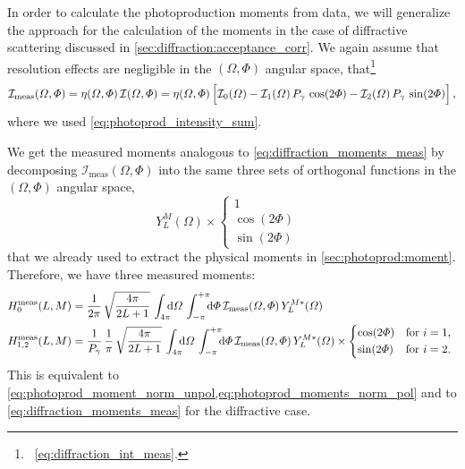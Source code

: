 In order to calculate the photoproduction moments from data, we will
generalize the approach for the calculation of the moments in the case
of diffractive scattering discussed in
\cref{sec:diffraction:acceptance_corr}.  We again assume that
resolution effects are negligible in the $(\Omega, \Phi)$ angular
space, \ie that\footnote{\Confer\ \cref{eq:diffraction_int_meas}.}
\begin{equation}
  \label{eq:photoprod_intensity_meas}
  \mathcal{I}_\text{meas}(\Omega, \Phi)
  = \eta(\Omega, \Phi)\, \mathcal{I}(\Omega, \Phi)
  = \eta(\Omega, \Phi) \sBrk[2]{\mathcal{I}_0(\Omega)
  - \mathcal{I}_1(\Omega)\, P_\gamma\, \cos(2 \Phi)
  - \mathcal{I}_2(\Omega)\, P_\gamma\, \sin(2 \Phi)},
\end{equation}
where we used \cref{eq:photoprod_intensity_sum}.

We get the measured moments analogous to
\cref{eq:diffraction_moments_meas} by decomposing
$\mathcal{I}_\text{meas}(\Omega, \Phi)$ into the same three sets of
orthogonal functions in the $(\Omega, \Phi)$ angular space, \ie
\begin{equation}
  Y_L^M(\Omega) \times \begin{cases}
    1 & \\
    \cos(2 \Phi) & \\
    \sin(2 \Phi) &
  \end{cases}
\end{equation}
that we already used to extract the physical moments in
\cref{sec:photoprod:moment}.  Therefore, we have three measured
moments:
\begin{align}
  \label{eq:photoprod_moment_meas_unpol}
  H_0^\text{meas}(L, M)
  ={}& \frac{1}{2 \pi}\, \sqrt{\frac{4 \pi}{2 L + 1}}\, \int_{4 \pi}\!\!\! \dif{\Omega}\, \int_{-\pi}^{+\pi}\!\!\! \dif{\Phi}\,
  \mathcal{I}_\text{meas}(\Omega, \Phi)\, Y_L^{M *}(\Omega)
  \\
  \label{eq:photoprod_moments_meas_pol}
  H_{1, 2}^\text{meas}(L, M)
  ={}& \frac{1}{P_\gamma}\, \frac{1}{\pi}\, \sqrt{\frac{4 \pi}{2 L + 1}}\, \int_{4 \pi}\!\!\! \dif{\Omega}\, \int_{-\pi}^{+\pi}\!\!\! \dif{\Phi}\,
  \mathcal{I}_\text{meas}(\Omega, \Phi)\, Y_L^{M *}(\Omega) \times \begin{cases*}
    \cos(2 \Phi) & for $i = 1$, \\
    \sin(2 \Phi) & for $i = 2$.
  \end{cases*}
\end{align}
This is equivalent to
\cref{eq:photoprod_moment_norm_unpol,eq:photoprod_moments_norm_pol}
and to \cref{eq:diffraction_moments_meas} for the diffractive case.

